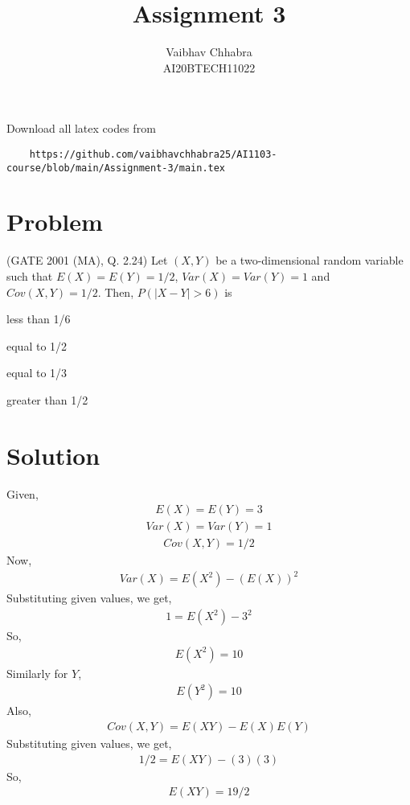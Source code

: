 \documentclass[journal,12pt,twocolumn]{IEEEtran}
\begin{document}
     \def\topbox#1{\raisebox{-\baselineskip}[0in][0in]{#1}}
     \def\midbox#1{\raisebox{-0.5\baselineskip}[0in][0in]{#1}}
\vspace{3cm}
\title{Assignment 3}
\author{Vaibhav Chhabra \\ AI20BTECH11022}
\maketitle
\newpage
\bigskip
\renewcommand{\thefigure}{\theenumi}
\renewcommand{\thetable}{\theenumi}
Download all latex codes from 
\begin{lstlisting}
    https://github.com/vaibhavchhabra25/AI1103-course/blob/main/Assignment-3/main.tex
\end{lstlisting}
\section{Problem}
(GATE 2001 (MA), Q. 2.24)
Let $(X,Y)$ be a two-dimensional random variable such that $E(X)=E(Y)=1/2$, $Var(X)=Var(Y)=1$ and $Cov(X,Y)=1/2$.
Then, $P(|X-Y|>6)$ is
\begin{enumerate}
\begin{multicols}{2}
    \item less than 1/6
    \item equal to 1/2
    \item equal to 1/3
    \item greater than 1/2
\end{multicols}
\end{enumerate}

\section{Solution}
Given,
\begin{align} \label{eq-1}
    E(X)=E(Y)=3
\end{align}
\begin{align}
    Var(X)=Var(Y)=1
\end{align}
\begin{align}
    Cov(X,Y)=1/2
\end{align}
Now,
\begin{align}
    Var(X)=E(X^2)-(E(X))^2
\end{align}
Substituting given values, we get,
\begin{align}
    1=E(X^2)-3^2
\end{align}
So,
\begin{align} \label{eq-2}
    E(X^2)=10
\end{align}
Similarly for $Y$,
\begin{align} \label{eq-3}
    E(Y^2)=10
\end{align}
Also,
\begin{align}
    Cov(X,Y)=E(XY)-E(X)E(Y)
\end{align}
Substituting given values, we get,
\begin{align}
    1/2=E(XY)-(3)(3)
\end{align}
So,
\begin{align} \label{eq-4}
    E(XY)=19/2
\end{align}
\end{document}
